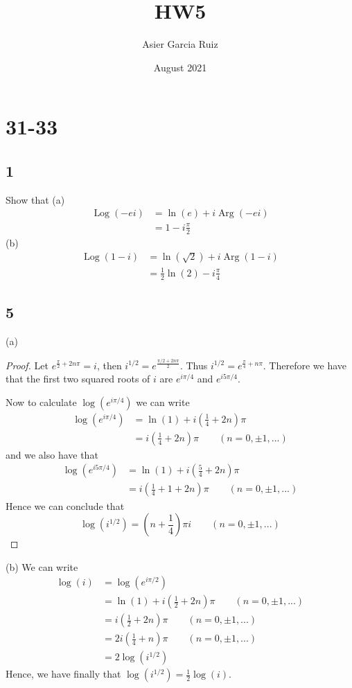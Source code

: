 \documentclass{article}
\title{HW5}
\author{Asier Garcia Ruiz }
\date{August 2021}
\DeclareMathOperator*{\Log}{Log}
\DeclareMathOperator*{\Arg}{Arg}
\begin{document}
\maketitle

\section*{31-33}
\subsection*{1} %
Show that
(a)\begin{align*}
    \Log(-ei) & = \ln(e) + i\Arg(-ei) \\
              & = 1 - i\frac{\pi}{2}
\end{align*}
(b) \begin{align*}
    \Log(1 - i) & = \ln(\sqrt{2}) + i\Arg(1 - i)       \\
                & = \frac{1}{2}\ln(2) - i\frac{\pi}{4}
\end{align*}

\subsection*{5} %
(a)
\begin{proof}
    Let $e^{\frac{\pi}{2} + 2n\pi} = i$, then $i^{1/2} = e^{\frac{\pi/2 + 2n\pi}{2}}$.
    Thus $i^{1/2} = e^{\frac{\pi}{4} + n\pi}$. Therefore we have that the first two
    squared roots of $i$ are $e^{i\pi/4}$ and $e^{i5\pi/4}$.

    Now to calculate $\log(e^{i\pi/4})$ we can write
    \begin{align*}
        \log(e^{i\pi/4}) & = \ln(1) + i(\frac{1}{4}+2n)\pi                    \\
                         & = i(\frac{1}{4} + 2n)\pi \qquad (n = 0, \pm 1,...)
    \end{align*}
    and we also have that
    \begin{align*}
        \log(e^{i5\pi/4}) & = \ln(1) + i(\frac{5}{4}+2n)\pi                       \\
                          & = i(\frac{1}{4} + 1 + 2n)\pi \qquad (n= 0, \pm 1,...)
    \end{align*}
    Hence we can conclude that
    $$\log(i^{1/2}) = (n + \frac{1}{4})\pi i \qquad (n = 0, \pm 1,...)$$
\end{proof}
(b)
We can write
\begin{align*}
    \log(i) & = \log(e^{i\pi /2})                                         \\
            & = \ln(1) + i(\frac{1}{2} + 2n)\pi \qquad (n = 0, \pm 1,...) \\
            & = i(\frac{1}{2} + 2n)\pi \qquad (n= 0, \pm 1,...)           \\
            & = 2i(\frac{1}{4} + n)\pi \qquad (n = 0, \pm 1,...)          \\
            & = 2 \log(i^{1/2})
\end{align*}
Hence, we have finally that $\log(i^{1/2}) = \frac{1}{2}\log(i)$.
\end{document}

